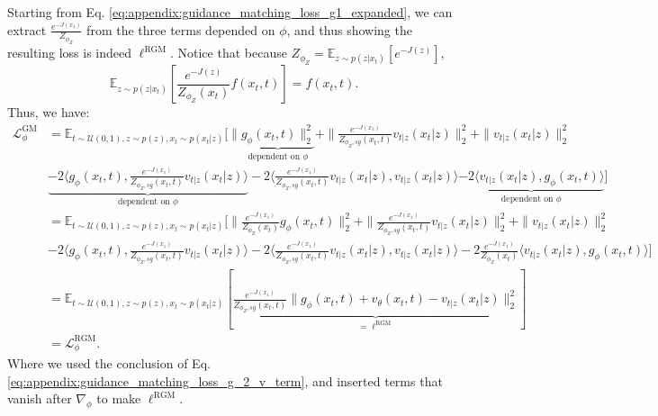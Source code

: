 Starting from Eq. \eqref{eq:appendix:guidance_matching_loss_g1_expanded}, we can extract $\frac{e^{-J(x_1)}}{Z_{\phi_Z}}$ from the three terms depended on $\phi$, and thus showing the resulting loss is indeed $\ell^{\text{RGM}}$.
Notice that because $Z_{\phi_Z} = \mathbb{E}_{z\sim p(z|x_t)}[e^{-J(z)}]$,
\begin{equation}
    \mathbb{E}_{z\sim p(z|x_t)}[\frac{e^{-J(z)}}{Z_{\phi_Z}(x_t)}f(x_t,t)] = f(x_t,t).
\end{equation}
Thus, we have:
\begin{align}
    \nonumber \mathcal{L}^{\text{GM}}_\phi& = \mathbb{E}_{t\sim\mathcal{U}(0,1),z\sim p(z),x_t \sim p(x_t|z)}[\|\underbrace{g_{\phi}(x_t,t)\|_2^2}_{\text{dependent on }\phi} + \|\frac{e^{-J(x_1)}}{Z_{\phi_Z,sg}(x_t,t)}v_{t|z}(x_t|z)\|_2^2 + \|v_{t|z}(x_t|z)\|_2^2 \\
    \nonumber& \underbrace{-2\langle g_{\phi}(x_t,t), \frac{e^{-J(x_1)}}{Z_{\phi_Z,sg}(x_t,t)}v_{t|z}(x_t|z)\rangle}_{\text{dependent on }\phi} - 2\langle\frac{e^{-J(x_1)}}{Z_{\phi_Z,sg}(x_t,t)}v_{t|z}(x_t|z), v_{t|z}(x_t|z)\rangle \underbrace{- 2\langle v_{t|z}(x_t|z), g_{\phi}(x_t,t)\rangle}_{\text{dependent on }\phi} ] \\
   \nonumber & =\mathbb{E}_{t\sim\mathcal{U}(0,1),z\sim p(z),x_t \sim p(x_t|z)}[\|\frac{e^{-J(x_1)}}{Z_{\phi_Z}(x_t)}{g_{\phi}(x_t,t)\|_2^2} + \|\frac{e^{-J(x_1)}}{Z_{\phi_Z,sg}(x_t,t)}v_{t|z}(x_t|z)\|_2^2 + \|v_{t|z}(x_t|z)\|_2^2 \\
    \nonumber& {-2\langle g_{\phi}(x_t,t), \frac{e^{-J(x_1)}}{Z_{\phi_Z,sg}(x_t,t)}v_{t|z}(x_t|z)\rangle} - 2\langle\frac{e^{-J(x_1)}}{Z_{\phi_Z,sg}(x_t,t)}v_{t|z}(x_t|z), v_{t|z}(x_t|z)\rangle - 2\frac{e^{-J(x_1)}}{Z_{\phi_Z}(x_t)}\langle v_{t|z}(x_t|z), g_{\phi}(x_t,t)\rangle ] \\
    & = \mathbb{E}_{t\sim\mathcal{U}(0,1),z\sim p(z),x_t \sim p(x_t|z)} \left[\underbrace{\frac{e^{-J(x_1)}}{Z_{\phi_Z,sg}(x_t,t)} \|g_{\phi}(x_t,t) + v_\theta(x_t,t) - v_{t|z}(x_t|z)\|_2^2}_{=\ell^{\text{RGM}}}\right]\\
    &=\mathcal{L}_\phi^{\text{RGM}}.
\end{align}
Where we used the conclusion of Eq. \eqref{eq:appendix:guidance_matching_loss_g_2_v_term}, and inserted terms that vanish after $\nabla_{\phi}$ to make $\ell^{\text{RGM}}$.


